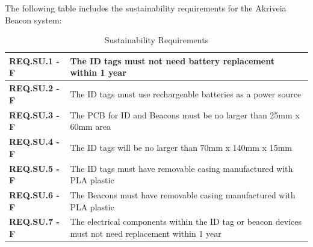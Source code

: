 \break
The following table includes the sustainability requirements for the Akriveia Beacon system:

\bgroup
\def\arraystretch{1.5}
\begin{table}[H]
\centering
\begin{tabular}{ | m{3cm} | m{13cm}| } 
\hline
\textbf{REQ.SU.1 - F} & The ID tags must not need battery replacement within 1 year \\
\hline
\textbf{REQ.SU.2 - F} & The ID tags must use rechargeable batteries as a power source \\
\hline
\textbf{REQ.SU.3 - F} & The PCB for ID and Beacons must be no larger than 25mm x 60mm area \\
\hline
\textbf{REQ.SU.4 - F} & The ID tags will be no larger than 70mm x 140mm x 15mm \\
\hline
\textbf{REQ.SU.5 - F} & The ID tags must have removable casing manufactured with PLA plastic \\
\hline
\textbf{REQ.SU.6 - F} & The Beacons must have removable casing manufactured with PLA plastic \\
\hline
\textbf{REQ.SU.7 - F} & The electrical components within the ID tag or beacon devices must not need replacement within 1 year \\ 
\hline
\end{tabular}
\caption{Sustainability Requirements}
\end{table}	


%